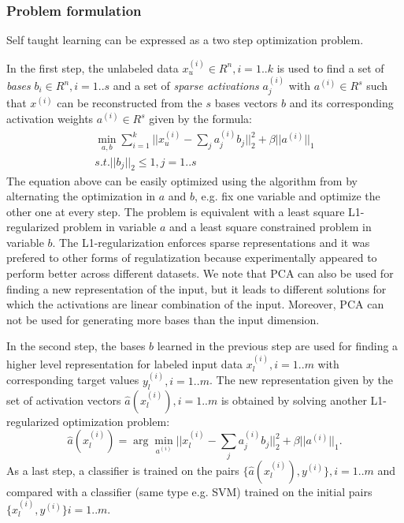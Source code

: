 \documentclass[10pt,journal,a4paper]{IEEEtran}
\begin{document}
\subsubsection{Problem formulation}
Self taught learning can be expressed as a two step optimization problem.

In the first step, the unlabeled data $x^{(i)}_u \in R^n, i=1..k$ is used to find a set of \textit{bases} $b_i \in R^n, i=1..s$ and a set of \textit{sparse activations} $a_j^{(i)}$ with $a^{(i)}\in R^s$ such that $x^{(i)}$ can
be reconstructed from the $s$ bases vectors $b$ and its corresponding activation weights $a^{(i)} \in R^s$ given by the formula:
\begin{equation}
\begin{array}{c }
	\min_{a,b} \sum_{i=1}^k ||x_u^{(i)} - \sum_j a_j^{(i)} b_j||_2^2 + \beta||a^{(i)}||_1    \\
	 s.t. ||b_j||_2 \leq 1, j=1..s
	\end{array}
\end{equation}
The equation above can be easily optimized using the algorithm from \cite{sparsetraining} by alternating the optimization in $a$ and $b$, e.g. fix one variable and optimize the other one at every step.
The problem is equivalent with a least square L1-regularized problem in variable $a$ and a least square constrained problem in  variable $b$. The L1-regularization enforces sparse representations and it was prefered to other forms of regulatization because experimentally appeared to perform better across different datasets. We note that PCA can also be used for finding a new representation of the input, but it leads to different solutions for which the activations are linear combination of the input. Moreover,  PCA can not be used for generating more bases than the input dimension.


In the second step, the bases $b$ learned in the previous step are used for finding a higher level representation for labeled input data $x_l^{(i)}, i=1..m$ with corresponding target values $y_l^{(i)}, i=1..m$. The new representation given by the set of activation vectors $\hat{a}(x_l^{(i)}), i=1..m$ is obtained by solving another L1- regularized optimization problem:
\begin{equation}
\hat{a}(x_l^{(i)}) = \arg\min_{a^{(i)}}|| x_l^{(i)} - \sum_j a_j^{(i)}b_j||_2^2 + \beta||a^{(i)}||_1.
\end{equation}
As a last step, a classifier is trained on the pairs $\{\hat{a}(x_l^{(i)}), y^{(i)}\} , i=1..m$ and compared with a classifier (same type e.g. SVM) trained on the initial pairs $\{x_l^{(i)}, y^{(i)}\} i=1..m$.
\end{document}
